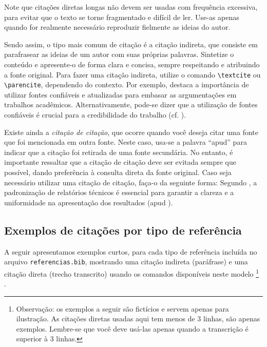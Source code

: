 Note que citações diretas longas não devem ser usadas com frequência excessiva, para evitar que o
texto se torne fragmentado e difícil de ler. Use-as apenas quando for realmente necessário
reproduzir fielmente as ideias do autor.

Sendo assim, o tipo mais comum de citação é a citação indireta,
que consiste em parafrasear as ideias de um autor com suas próprias palavras. Sintetize o conteúdo e
apresente-o de forma clara e concisa, sempre respeitando e atribuindo a fonte original.
Para fazer uma citação indireta, utilize o comando \texttt{\textbackslash textcite} ou
\texttt{\textbackslash parencite}, dependendo do contexto. Por exemplo, \textcite{silva2020} destaca a importância de
utilizar fontes confiáveis e atualizadas para embasar as argumentações em trabalhos acadêmicos.
Alternativamente, pode-se dizer que a utilização de fontes confiáveis é crucial para a credibilidade
do trabalho (cf. \parencite{silva2020}).

Existe ainda a \emph{citação de citação}, que ocorre quando você deseja citar uma fonte que foi
mencionada em outra fonte. Neste caso, usa-se a palavra ``apud'' para indicar que a citação foi
retirada de uma fonte secundária. No entanto, é importante ressaltar que a citação de citação deve
ser evitada sempre que possível, dando preferência à consulta direta da fonte original. Caso seja
necessário utilizar uma citação de citação, faça-o da seguinte forma: Segundo \textcite[p. 45]{rodrigues2017}, a padronização de relatórios técnicos é essencial para garantir a clareza e a uniformidade na apresentação dos resultados (apud \textcite{lima2022}).

\subsection{Exemplos de citações por tipo de referência}

A seguir apresentamos exemplos curtos, para cada tipo de referência incluída no arquivo
\texttt{referencias.bib}, mostrando uma citação indireta (paráfrase) e uma citação direta (trecho
transcrito) usando os comandos disponíveis neste modelo%
\footnote{Observação: os exemplos a seguir são fictícios e servem apenas para ilustração. As
    citações diretas usadas aqui tem menos de 3 linhas, são apenas exemplos. Lembre-se que você deve
    usá-las apenas quando a transcrição é superior à 3 linhas.}%
.

